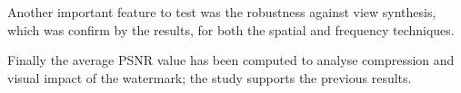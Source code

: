  \begin{table}[htbp]
 \begin{center}
 \caption{Detection statistic for a quality degradation of $3\%$\label{tab:06}}
 \end{center}
 \end{table}
\begin{table}[htbp]
 
 \begin{center}
 \caption{Detection statistic for a quality degradation of $1\%$ and accepted fall-out of $1\%$ \label{tab:G1}}
 \end{center}
 \end{table}

Another important feature to test was the robustness against view synthesis, which was confirm by the results, for both the spatial and frequency techniques.

Finally the average PSNR value has been computed to analyse compression and visual impact of the watermark; the study supports the previous results. 


